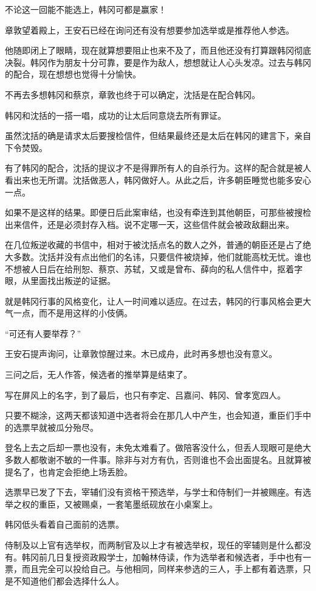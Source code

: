 不论这一回能不能选上，韩冈可都是赢家！

章敦望着殿上，王安石已经在询问还有没有想要参加选举或是推荐他人参选。

他随即闭上了眼睛，现在就算想要阻止也来不及了，而且他还没有打算跟韩冈彻底决裂。韩冈作为朋友十分可靠，要是作为敌人，想想就让人心头发凉。过去与韩冈的配合，现在想想也觉得十分愉快。

不再去多想韩冈和蔡京，章敦也终于可以确定，沈括是在配合韩冈。

韩冈和沈括的一搭一唱，成功的让太后同意烧去所有罪证。

虽然沈括的确是请求太后要搜检信件，但结果最终还是太后在韩冈的建言下，亲自下令焚毁。

有了韩冈的配合，沈括的提议才不是得罪所有人的自杀行为。这样的配合就是被人看出来也无所谓。沈括做恶人，韩冈做好人。从此之后，许多朝臣睡觉也能多安心一点。

如果不是这样的结果。即便日后此案审结，也没有牵连到其他朝臣，可那些被搜检出来信件，还是必须封存入档。说不定哪一天，这些信件就会被政敌翻出来。

在几位叛逆收藏的书信中，相对于被沈括点名的数人之外，普通的朝臣还是占了绝大多数。沈括并没有点出他们的名讳，只要信件被烧掉，他们就能高枕无忧。谁也不想被人日后在给刑恕、蔡京、苏轼，又或是曾布、薛向的私人信件中，抠着字眼，从里面找出叛逆的证据。

就是韩冈行事的风格变化，让人一时间难以适应。在过去，韩冈的行事风格会更大气一点，而不是用这样的小伎俩。

“可还有人要举荐？”

王安石提声询问，让章敦惊醒过来。木已成舟，此时再多想也没有意义。

三问之后，无人作答，候选者的推举算是结束了。

写在屏风上的名字，到了最后，也只有李定、吕嘉问、韩冈、曾孝宽四人。

只要不糊涂，这两天都该知道中选者将会在那几人中产生，也会知道，重臣们手中的选票早就被瓜分殆尽。

登名上去之后却一票也没有，未免太难看了。做陪客没什么，但丢人现眼可是绝大多数人都敬谢不敏的一件事。除非与对方有仇，否则谁也不会出面提名。且就算被提名了，也肯定会拒绝上场丢脸。

选票早已发了下去，宰辅们没有资格干预选举，与学士和侍制们一并被赐座。有选举之权的重臣，又被赐桌，一套笔墨纸砚放在小桌案上。

韩冈低头看着自己面前的选票。

侍制及以上官有选举权，而两制官及以上才有被选举权，现任的宰辅则是什么都没有。韩冈前几日复授资政殿学士，加翰林侍读，作为选举者和候选者，手中也有一票，而且完全可以投给自己。与他相同，同样来参选的三人，手上都有着选票，只是不知道他们都会选择什么人。


